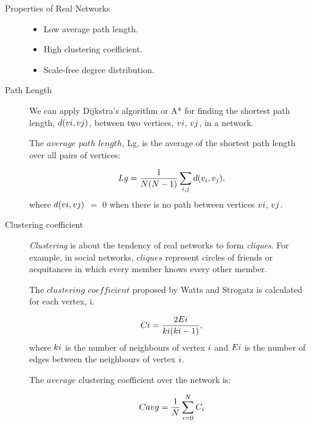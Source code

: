 \documentclass[a4paper,11pt,titlepage]{article}
\begin{document}
\begin{description}
\item [Properties of Real Networks] 

\begin{itemize}
\item Low average path length.

\item High clustering coefficient.

\item Scale-free degree distribution.

\end{itemize}

\item [Path Length]

We can apply Dijkstra's algorithm or A* for finding the shortest path length,
\(d(v\lowercase{i},v\lowercase{j})\), between two vertices, \(v\lowercase{i}\), 
\(v\lowercase{j}\), in a network.

The \(average\) \(path\) \(length\), L\lowercase{G}, is the average of the 
shortest path length over all pairs of vertices:

\begin{equation}
\ L\lowercase{G} =\frac{1}{N(N-1)} \sum_{i, j} d(v_i,v_j),
\end{equation}
where \(d(v\lowercase{i},v\lowercase{j})\) \(=\) $0$ when there is no path between
 vertices \(v\lowercase{i}\), \(v\lowercase{j}\).

\item [Clustering coefficient]

\emph{Clustering} is about the tendency of real networks to form \emph{cliques}.  
For example, in social networks, \(cliques\) represent circles of friends or 
acquitances in which every member knows every other member.

The \(clustering\) \(coefficient\) proposed by Watts and Strogatz is calculated 
for each vertex, \lowercase{i}.

\begin{equation}
\ C\lowercase{i} =\frac{2E\lowercase{i}}{k\lowercase{i}(k\lowercase{i}-1)},
\end{equation}
where \(k\lowercase{i}\) is the number of neighbours of vertex \(\lowercase{i}\) and 
\(E\lowercase{i}\) is the number of edges between the neighbours of vertex \(\lowercase{i}\).

The \(average\) clustering coefficient over the network is:

\begin{equation}
\ C\lowercase{avg} = \frac{1}{N}\sum_{i=0}^{N} C_i
\end{equation}


\end{description}
\end{document}
